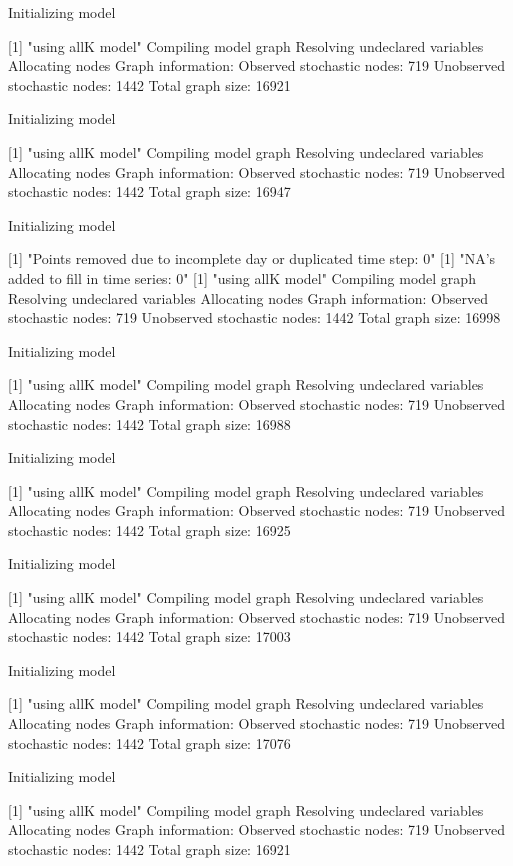 \documentclass[11pt,lineno]{manuscript}\usepackage[]{graphicx}\usepackage[]{xcolor}
\begin{document}
Initializing model

[1] "using allK model"
Compiling model graph
   Resolving undeclared variables
   Allocating nodes
Graph information:
   Observed stochastic nodes: 719
   Unobserved stochastic nodes: 1442
   Total graph size: 16921

Initializing model

[1] "using allK model"
Compiling model graph
   Resolving undeclared variables
   Allocating nodes
Graph information:
   Observed stochastic nodes: 719
   Unobserved stochastic nodes: 1442
   Total graph size: 16947

Initializing model

[1] "Points removed due to incomplete day or duplicated time step: 0"
[1] "NA's added to fill in time series: 0"
[1] "using allK model"
Compiling model graph
   Resolving undeclared variables
   Allocating nodes
Graph information:
   Observed stochastic nodes: 719
   Unobserved stochastic nodes: 1442
   Total graph size: 16998

Initializing model

[1] "using allK model"
Compiling model graph
   Resolving undeclared variables
   Allocating nodes
Graph information:
   Observed stochastic nodes: 719
   Unobserved stochastic nodes: 1442
   Total graph size: 16988

Initializing model

[1] "using allK model"
Compiling model graph
   Resolving undeclared variables
   Allocating nodes
Graph information:
   Observed stochastic nodes: 719
   Unobserved stochastic nodes: 1442
   Total graph size: 16925

Initializing model

[1] "using allK model"
Compiling model graph
   Resolving undeclared variables
   Allocating nodes
Graph information:
   Observed stochastic nodes: 719
   Unobserved stochastic nodes: 1442
   Total graph size: 17003

Initializing model

[1] "using allK model"
Compiling model graph
   Resolving undeclared variables
   Allocating nodes
Graph information:
   Observed stochastic nodes: 719
   Unobserved stochastic nodes: 1442
   Total graph size: 17076

Initializing model

[1] "using allK model"
Compiling model graph
   Resolving undeclared variables
   Allocating nodes
Graph information:
   Observed stochastic nodes: 719
   Unobserved stochastic nodes: 1442
   Total graph size: 16921
\end{document}
